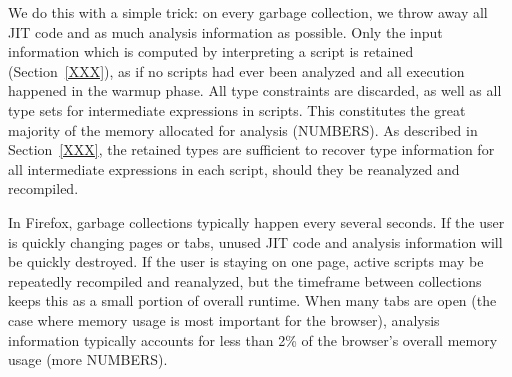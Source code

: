 We do this with a simple trick:
on every garbage collection, we throw away all JIT code and as much analysis
information as possible.
Only the input information which is computed by interpreting
a script is retained (Section~\ref{XXX}),
as if no scripts had ever been analyzed and all
execution happened in the warmup phase.
All type constraints are discarded, as well as all type sets for
intermediate expressions in scripts.
This constitutes the great majority of the memory allocated for analysis
(NUMBERS).
As described in Section~\ref{XXX}, the retained types are sufficient to
recover type information for all intermediate expressions in each script,
should they be reanalyzed and recompiled.

In Firefox, garbage collections typically happen every several seconds.
If the user is quickly changing pages or tabs, unused JIT code and analysis
information will be quickly destroyed.
If the user is staying on one page, active scripts may be repeatedly
recompiled and reanalyzed, but the timeframe between collections keeps this
as a small portion of overall runtime.
When many tabs are open (the case where memory usage is most important
for the browser), analysis information typically accounts
for less than 2\% of the browser's overall memory usage (more NUMBERS).
